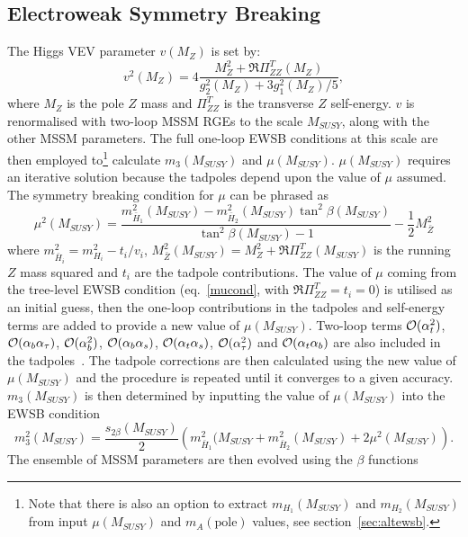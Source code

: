 \documentclass[]{article}
\def\at{\alpha_t}
\def\ab{\alpha_b}
\def\as{\alpha_s}
\def\atau{\alpha_{\tau}}
\def\oatab{{\cal O}(\at\ab)}
\def\oatas{{\cal O}(\at\as)}
\def\oabas{{\cal O}(\ab\as)}
\def\oatq{{\cal O}(\at^2)}
\def\oabq{{\cal O}(\ab^2)}
\def\oatauq{{\cal O}(\atau^2)}
\def\oabatau{{\cal O}(\ab \atau)}
\begin{document}
\subsection{Electroweak Symmetry Breaking}

The Higgs VEV parameter $v(M_Z)$ is set by:
\begin{equation}
v^2(M_Z) = 4 \frac{M_Z^2 + \Re\Pi_{ZZ}^T(M_Z)}{g_2^2(M_Z) + 3 g_1^2(M_Z) / 5},
\end{equation}
where
$M_Z$ is the pole $Z$ mass and
$\Pi_{ZZ}^T$ is the transverse $Z$ self-energy. $v$ is renormalised with
two-loop MSSM RGEs to the scale $M_{SUSY}$, along with the other MSSM
parameters.  
The full one-loop EWSB
conditions at this scale are then employed to\footnote{Note that there is also
  an option to extract $m_{H_1}(M_{SUSY})$ and $m_{H_2}(M_{SUSY})$ from input
  $\mu(M_{SUSY})$ and  
$m_A(\mbox{pole})$ values, see section~\protect\ref{sec:altewsb}.}
calculate $m_3(M_{SUSY})$ and $\mu(M_{SUSY})$. $\mu(M_{SUSY})$ requires an iterative solution
because the tadpoles depend upon the value of $\mu$ assumed.
The symmetry breaking condition for $\mu$ can be phrased
as~\cite{Pierce:1997zz}
\begin{equation}
\mu^2(M_{SUSY}) =
\frac{m_{\bar{H}_1}^2(M_{SUSY}) -  m_{\bar{H}_2}^2(M_{SUSY}) \tan^2
  \beta(M_{SUSY})}{\tan^2 \beta(M_{SUSY}) - 1} 
- \frac{1}{2} M_{\bar Z}^2
\label{mucond} 
\end{equation}
where $m_{\bar{H}_i}^2 = m_{H_i}^2 - t_i/v_i$, $M_{\bar Z}^2(M_{SUSY}) = M_Z^2 +
\Re\Pi_{ZZ}^T(M_{SUSY})$ is the running $Z$ mass squared and
$t_i$ are the tadpole contributions.
The value of $\mu$ coming from the tree-level EWSB
condition (eq.~\ref{mucond}, with $\Re\Pi_{ZZ}^T=t_i=0$)
is utilised as an initial guess, then the one-loop contributions in the
tadpoles and self-energy terms are added to
provide a new value of $\mu(M_{SUSY})$. Two-loop terms 
$\oatq$, $\oabatau$, $\oabq$, $\oabas$, $\oatas$, $\oatauq$ and
$\oatab$
 are also included
in the 
tadpoles~\cite{Dedes:2002dy,Dedes:2003km}. 
The tadpole corrections are then calculated
using the new value of $\mu(M_{SUSY})$ and the procedure is repeated until it
converges to a given accuracy. $m_3(M_{SUSY})$ is then determined by inputting
the value 
of $\mu(M_{SUSY})$ into the EWSB condition
\begin{equation}
m_3^2(M_{SUSY})=\frac{s_{2\beta}(M_{SUSY})}{2} \left( m_{\bar{H}_1}^2(M_{SUSY} + m_{\bar{H}_2}^2(M_{SUSY}) + 2 \mu^2(M_{SUSY})
\right). \label{Bcond}
\end{equation}
The ensemble of MSSM parameters are then evolved using the $\beta$ functions
\end{document}
